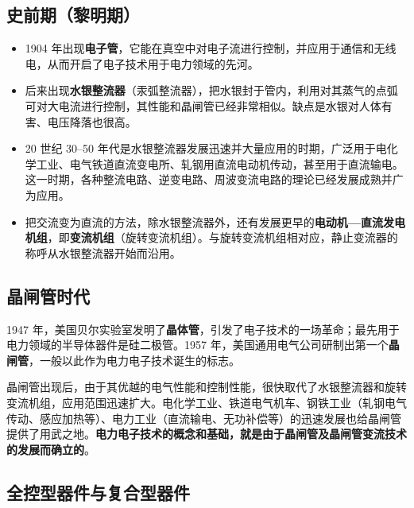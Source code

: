 \subsection{史前期（黎明期）}

\begin{itemize}
  \item 1904 年出现\textbf{电子管}，它能在真空中对电子流进行控制，并应用于通信和无线电，从而开启了电子技术用于电力领域的先河。
  \item 后来出现\textbf{水银整流器}（汞弧整流器），把水银封于管内，利用对其蒸气的点弧可对大电流进行控制，其性能和晶闸管已经非常相似。缺点是水银对人体有害、电压降落也很高。
  \item 20 世纪 30--50 年代是水银整流器发展迅速并大量应用的时期，广泛用于电化学工业、电气铁道直流变电所、轧钢用直流电动机传动，甚至用于直流输电。这一时期，各种整流电路、逆变电路、周波变流电路的理论已经发展成熟并广为应用。
  \item 把交流变为直流的方法，除水银整流器外，还有发展更早的\textbf{电动机—直流发电机组}，即\textbf{变流机组}（旋转变流机组）。与旋转变流机组相对应，静止变流器的称呼从水银整流器开始而沿用。
\end{itemize}

\subsection{晶闸管时代}

1947 年，美国贝尔实验室发明了\textbf{晶体管}，引发了电子技术的一场革命；最先用于电力领域的半导体器件是硅二极管。1957 年，美国通用电气公司研制出第一个\textbf{晶闸管}，一般以此作为电力电子技术诞生的标志。


晶闸管出现后，由于其优越的电气性能和控制性能，很快取代了水银整流器和旋转变流机组，应用范围迅速扩大。电化学工业、铁道电气机车、钢铁工业（轧钢电气传动、感应加热等）、电力工业（直流输电、无功补偿等）的迅速发展也给晶闸管提供了用武之地。\textbf{电力电子技术的概念和基础，就是由于晶闸管及晶闸管变流技术的发展而确立的}。

\subsection{全控型器件与复合型器件}

